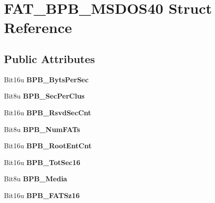 \hypertarget{structFAT__BPB__MSDOS40}{\section{F\-A\-T\-\_\-\-B\-P\-B\-\_\-\-M\-S\-D\-O\-S40 Struct Reference}
\label{structFAT__BPB__MSDOS40}
}
\subsection*{Public Attributes}
\begin{DoxyCompactItemize}
\item 
\hypertarget{structFAT__BPB__MSDOS40_a6efcee799c4112410741d2969eb5dac1}{Bit16u {\bfseries B\-P\-B\-\_\-\-Byts\-Per\-Sec}}\label{structFAT__BPB__MSDOS40_a6efcee799c4112410741d2969eb5dac1}

\item 
\hypertarget{structFAT__BPB__MSDOS40_a6865ae9fe9690845c5ad027a192fb70f}{Bit8u {\bfseries B\-P\-B\-\_\-\-Sec\-Per\-Clus}}\label{structFAT__BPB__MSDOS40_a6865ae9fe9690845c5ad027a192fb70f}

\item 
\hypertarget{structFAT__BPB__MSDOS40_a8b136c70f533ccc4f79c1ebef343c418}{Bit16u {\bfseries B\-P\-B\-\_\-\-Rsvd\-Sec\-Cnt}}\label{structFAT__BPB__MSDOS40_a8b136c70f533ccc4f79c1ebef343c418}

\item 
\hypertarget{structFAT__BPB__MSDOS40_a2b34c947bd055fb5942a848ff13b29d6}{Bit8u {\bfseries B\-P\-B\-\_\-\-Num\-F\-A\-Ts}}\label{structFAT__BPB__MSDOS40_a2b34c947bd055fb5942a848ff13b29d6}

\item 
\hypertarget{structFAT__BPB__MSDOS40_a725cd66174f9494044f0f646218c22d6}{Bit16u {\bfseries B\-P\-B\-\_\-\-Root\-Ent\-Cnt}}\label{structFAT__BPB__MSDOS40_a725cd66174f9494044f0f646218c22d6}

\item 
\hypertarget{structFAT__BPB__MSDOS40_a27bf10c1a5096729bbb7f3cc73d8ea6d}{Bit16u {\bfseries B\-P\-B\-\_\-\-Tot\-Sec16}}\label{structFAT__BPB__MSDOS40_a27bf10c1a5096729bbb7f3cc73d8ea6d}

\item 
\hypertarget{structFAT__BPB__MSDOS40_a7e4c4b99536d0fade24f87c413651003}{Bit8u {\bfseries B\-P\-B\-\_\-\-Media}}\label{structFAT__BPB__MSDOS40_a7e4c4b99536d0fade24f87c413651003}

\item 
\hypertarget{structFAT__BPB__MSDOS40_a26216870e4b39169787905bcc71ac482}{Bit16u {\bfseries B\-P\-B\-\_\-\-F\-A\-T\-Sz16}}\label{structFAT__BPB__MSDOS40_a26216870e4b39169787905bcc71ac482}


\end{DoxyCompactItemize}
